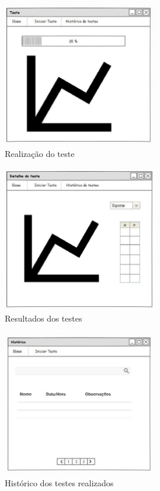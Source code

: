 	\begin{figure}[h]
		\centering
		\includegraphics[width=0.6\textwidth]{figuras/teste.eps}
		\caption{Realização do teste}
		\label{img:teste}
	\end{figure}


	\begin{figure}[h]
		\centering
		\includegraphics[width=0.6\textwidth]{figuras/detalheteste.eps}
		\caption{Resultados dos testes}
		\label{img:detalhe}
	\end{figure}


	\begin{figure}[h]
		\centering
		\includegraphics[width=0.6\textwidth]{figuras/historico.eps}
		\caption{Histórico dos testes realizados}
		\label{img:historico}
	\end{figure}




